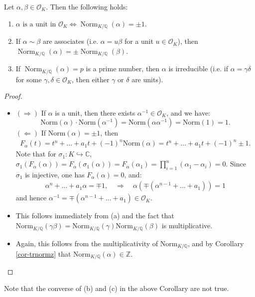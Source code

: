 \begin{corollary} \label{cor-normz}
    Let $\alpha, \beta \in \mathcal{O}_K$. Then the following holds:
    \begin{enumerate}
        \item[(a)] $\alpha\text{ is a unit in } \mathcal{O}_K \Leftrightarrow \operatorname{Norm}_{K/\mathbb{Q}}(\alpha)=\pm 1.$
        \item[(b)] If $\alpha \sim \beta$ are associates (i.e. $\alpha = u\beta$ for a unit $u \in \mathcal{O}_K$), then $\operatorname{Norm}_{K/\mathbb{Q}}(\alpha)= \pm \operatorname{Norm}_{K/\mathbb{Q}}(\beta)$.
        \item[(c)] If $\operatorname{Norm}_{K/\mathbb{Q}}(\alpha) = p$ is a prime number, then $\alpha$ is irreducible (i.e. if $\alpha = \gamma \delta$ for some $\gamma, \delta \in \mathcal{O}_K$, then either $\gamma$ or $\delta$ are units).
    \end{enumerate}
\end{corollary}
\begin{proof}
\begin{itemize} 
    \item[(a)] $(\Rightarrow)$ If $\alpha$ is a unit, then there exists $\alpha^{-1} \in \mathcal{O}_K$, and we have:
$$\mathrm{Norm}(\alpha) \cdot \mathrm{Norm}(\alpha^{-1}) = \mathrm{Norm}(\alpha \alpha^{-1}) = \mathrm{Norm}(1) = 1.$$
$(\Leftarrow)$ If $\mathrm{Norm}(\alpha) = \pm 1$, then 
\begin{align*}
F_\alpha(t) = t^n + \dots + a_1 t + (-1)^n \mathrm{Norm}(\alpha)
= t^n + \dots + a_1 t + (-1)^n \pm 1.
\end{align*}
Note that for $\sigma_1: K \hookrightarrow \mathbb{C}$,
$\sigma_1(F_{\alpha}(\alpha)) = F_{\alpha}(\sigma_1(\alpha)) = F_{\alpha}(\alpha_1) = \prod_{i=1}^n(\alpha_1 - \alpha_i) = 0$. Since $\sigma_1$ is injective, one has $F_{\alpha}(\alpha) = 0$, and:
\begin{align*}
\alpha^n + \dots + a_1 \alpha = \mp 1, \quad \Rightarrow \quad \alpha \left( \mp (\alpha^{n-1} + \dots + a_1) \right) = 1
\end{align*}
and hence $\alpha^{-1} = \mp (\alpha^{n-1} + \dots + a_1) \in \mathcal{O}_K$.    
\item[(b)] This follows immediately from (a) and the fact that $\mathrm{Norm}_{K/\mathbb{Q}}(\gamma \beta) = \mathrm{Norm}_{K/\mathbb{Q}}(\gamma) \mathrm{Norm}_{K/\mathbb{Q}}(\beta)$ is multiplicative.
\item[(c)] Again, this follows from the multiplicativity of $\mathrm{Norm}_{K/\mathbb{Q}}$, and by Corollary \ref{cor-trnormz} that $\mathrm{Norm}_{K/\mathbb{Q}}(\alpha) \in \mathbb{Z}$.
\end{itemize}
\end{proof}
Note that the converse of (b) and (c) in the above Corollary are not true.

